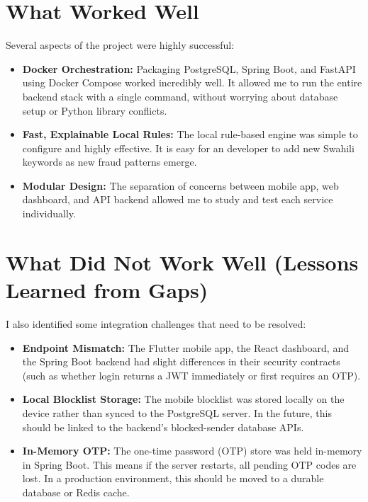 \section{What Worked Well}
Several aspects of the project were highly successful:
\begin{itemize}
  \item \textbf{Docker Orchestration:} Packaging PostgreSQL, Spring Boot, and FastAPI using Docker Compose worked incredibly well. It allowed me to run the entire backend stack with a single command, without worrying about database setup or Python library conflicts.
  \item \textbf{Fast, Explainable Local Rules:} The local rule-based engine was simple to configure and highly effective. It is easy for an developer to add new Swahili keywords as new fraud patterns emerge.
  \item \textbf{Modular Design:} The separation of concerns between mobile app, web dashboard, and API backend allowed me to study and test each service individually.
\end{itemize}

\section{What Did Not Work Well (Lessons Learned from Gaps)}
I also identified some integration challenges that need to be resolved:
\begin{itemize}
  \item \textbf{Endpoint Mismatch:} The Flutter mobile app, the React dashboard, and the Spring Boot backend had slight differences in their security contracts (such as whether login returns a JWT immediately or first requires an OTP).
  \item \textbf{Local Blocklist Storage:} The mobile blocklist was stored locally on the device rather than synced to the PostgreSQL server. In the future, this should be linked to the backend's blocked-sender database APIs.
  \item \textbf{In-Memory OTP:} The one-time password (OTP) store was held in-memory in Spring Boot. This means if the server restarts, all pending OTP codes are lost. In a production environment, this should be moved to a durable database or Redis cache.
\end{itemize}

